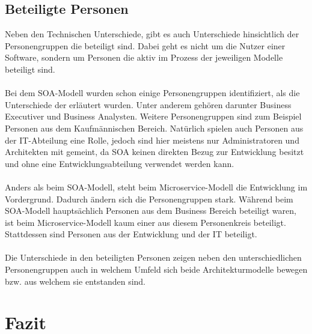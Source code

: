 \subsection{Beteiligte Personen}
\label{subsec:FazitBeteiligtePersonen}
Neben den Technischen Unterschiede, gibt es auch Unterschiede hinsichtlich der Personengruppen die beteiligt sind. Dabei geht es nicht um die Nutzer einer Software, sondern um Personen die aktiv im Prozess der jeweiligen Modelle beteiligt sind.
\\\\
Bei dem SOA-Modell wurden schon einige Personengruppen identifiziert, als die Unterschiede der  erläutert wurden. Unter anderem gehören darunter Business Executiver und Business Analysten. Weitere Personengruppen sind zum Beispiel Personen aus dem Kaufmännischen Bereich. Natürlich spielen auch Personen aus der IT-Abteilung eine Rolle, jedoch sind hier meistens nur Administratoren und Architekten mit gemeint, da SOA keinen direkten Bezug zur Entwicklung besitzt und ohne eine Entwicklungsabteilung verwendet werden kann.
\\\\
Anders als beim SOA-Modell, steht beim Microservice-Modell die Entwicklung im Vordergrund. Dadurch ändern sich die Personengruppen stark. Während beim SOA-Modell hauptsächlich Personen aus dem Business Bereich beteiligt waren, ist beim Microservice-Modell kaum einer aus diesem Personenkreis beteiligt. Stattdessen sind Personen aus der Entwicklung und der IT beteiligt.
\\\\
Die Unterschiede in den beteiligten Personen zeigen neben den unterschiedlichen Personengruppen auch in welchem Umfeld sich beide Architekturmodelle bewegen bzw. aus welchem sie entstanden sind.

\section{Fazit}
\label{sec:Fazit}